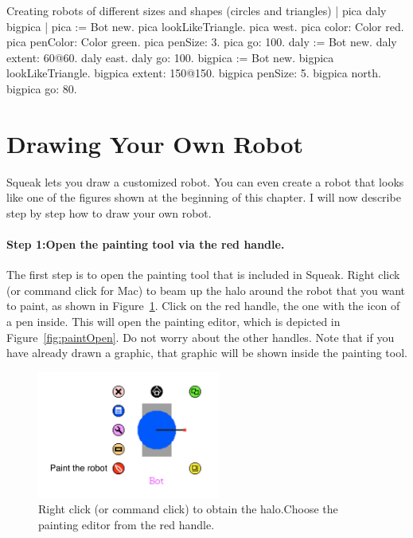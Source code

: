 \documentclass[a4paper,10pt,twoside]{book}
\begin{document}
\begin{script}[shape]{Creating robots of different sizes and shapes (circles and triangles)}
| pica daly bigpica | 
pica := Bot new. 
pica lookLikeTriangle. 
pica west. 
pica color: Color red. 
pica penColor: Color green. 
pica penSize: 3. 
pica go: 100. 
daly := Bot new. 
daly extent: 60@60. 
daly east. 
daly go: 100. 
bigpica := Bot new. 
bigpica lookLikeTriangle. 
bigpica extent: 150@150. 
bigpica penSize: 5. 
bigpica north. 
bigpica go: 80. 
\end{script}

\section{Drawing Your Own Robot}

Squeak lets you draw a customized robot. You can even create a robot that looks like one of 
the figures shown at the beginning of this chapter. I will now describe step by step how to 
draw your own robot. 

\paragraph{Step 1:Open the painting tool via the red handle.}

The first step is to open the painting tool that is included in Squeak. Right click (or command click for Mac) to beam up the halo around the robot that you want to paint, as shown in Figure~\ref{fig:paintToolCaroFlap}. Click on the red 
handle, the one with the icon of a pen inside. This will open the painting editor, which 
is depicted in Figure~\ref{fig:paintOpen}. Do not worry about the other handles. Note that if you have 
already drawn a graphic, that graphic will be shown inside the painting tool. 


\begin{figure}[h]
\begin{center}
\includegraphics[width=6cm]{picaHaloAnnotated} 
\end{center}
\caption{Right click (or command click) to obtain the halo.Choose the painting editor 
from the red handle. \label{fig:paintToolCaroFlap}}
\end{figure}
\end{document}
